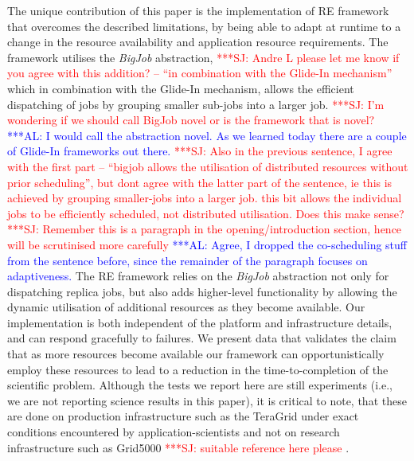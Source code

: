 \documentclass{rspublic}
\newcommand{\alnote}[1]{ {\textcolor{blue} { ***AL: #1 }}}
\newcommand{\jhanote}[1]{ {\textcolor{red} { ***SJ: #1 }}}
\newcommand{\alnote}[1]{}
\newcommand{\jhanote}[1]{}
\begin{document}
The unique contribution of this paper is the implementation of RE
framework that overcomes the described limitations, by being able to
adapt at runtime to a change in the resource availability and
application resource requirements. The framework utilises the
\emph{BigJob} abstraction, \jhanote{Andre L please let me know if you
  agree with this addition? -- ``in combination with the Glide-In
  mechanism''} which in combination with the Glide-In mechanism,
allows the efficient dispatching of jobs by grouping smaller sub-jobs
into a larger job. \jhanote{I'm wondering if we should call BigJob
  novel or is the framework that is
  novel?}  
\alnote{I would call the abstraction novel. As we learned today there
are a couple of Glide-In frameworks out there.} 
\jhanote{Also in the previous sentence, I agree with the first part --
  ``bigjob allows the utilisation of distributed resources without
  prior scheduling'', but dont agree with the latter part of the
  sentence, ie this is achieved by grouping smaller-jobs into a larger
  job. this bit allows the individual jobs to be efficiently
  scheduled, not distributed utilisation. Does this make sense?}
\jhanote{Remember this is a paragraph in the opening/introduction
  section, hence will be scrutinised more carefully} \alnote{Agree, I
  dropped the co-scheduling stuff from the sentence before, since the
  remainder of the paragraph focuses on adaptiveness.}  The RE
framework relies on the \emph{BigJob} abstraction not only for
dispatching replica jobs, but also adds higher-level functionality by
allowing the dynamic utilisation of additional resources as they
become available.  Our implementation is both independent of the
platform and infrastructure details, and can respond gracefully to
failures.  We present data that validates the claim that as more
resources become available our framework can opportunistically employ
these resources to lead to a reduction in the time-to-completion of
the scientific problem.  Although the tests we report here are still
experiments (i.e., we are not reporting science results in this
paper), it is critical to note, that these are done on production
infrastructure such as the TeraGrid under exact conditions encountered
by application-scientists and not on research infrastructure such as
Grid5000\jhanote{suitable reference here please}.
\end{document}

